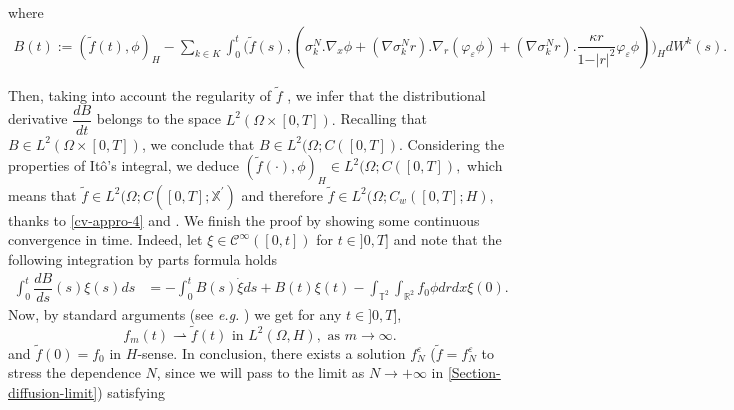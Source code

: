\documentclass[a4paper,12pt, reqno]{amsart}
\begin{document}
 where 
        \begin{align*}
            B(t) :=(\widetilde{f}(t), \phi )_H  -\sum_{k\in K}\int_0^t\big(\widetilde{f}(s),( \sigma_k^N.\nabla_x\phi +(\nabla \sigma_k^Nr).\nabla_r (\varphi_\varepsilon\phi)+(\nabla \sigma_k^Nr).\dfrac{\kappa r}{1-\vert r\vert^2}\varphi_\varepsilon\phi)\big)_HdW^k(s).
        \end{align*}

	Then, taking into account the regularity    of $\widetilde    f$ , we infer that the distributional derivative $\dfrac{dB}{dt}$ belongs to the space $L^2(\Omega\times[0,T]).$ Recalling that $B\in L^2(\Omega\times[0,T])$, we conclude that $ B\in   L^2(\Omega;C([0,T])$.
	Considering the properties of  It\^o's integral, we deduce
	$ (\widetilde    f(\cdot), \phi)_H \in L^2(\Omega;C([0,T]),$
	which  means   that   $\widetilde    f\in  L^2(\Omega;C([0,T];\mathbb{X}^\prime)$ and   therefore 
	$\widetilde    f\in  L^2(\Omega;C_w([0,T];H),$ thanks to \eqref{cv-appro-4}    and \cite[Lemma. 1.4 p. 263]{Temam77}. We   finish  the proof   by  showing some    continuous  convergence in  time.   Indeed,
	let  $\xi \in \mathcal{C}^\infty([0,t])$ for $t\in ]0,T]$ and note that the	following	integration	by	parts	formula	holds
	\begin{align}\label{IPPtimez-1}
		\int_0^t	\dfrac{dB}{ds}(s)\xi(s) ds&=-\int_0^tB(s)\dot\xi ds+B(t)\xi(t)-\int_{\mathbb{T}^2}\int_{\mathbb{R}^2}    f_0 \phi drdx\xi(0).
	\end{align}
	Now,    by  standard   arguments  (see \textit{e.g.}  \cite[proof    of  Prop. 3.]{vallet2019well} ) we  get
	for any $t\in ]0,T]$, $$    f_m(t)  \rightharpoonup \widetilde    f(t) \text{ in } L^2(\Omega,H), \text{ as } m\to \infty.$$
	and    $\widetilde f(0)=f_0$   in  $H$-sense. 	In  conclusion,     there   exists  a   solution $f^\varepsilon_N$  ($\widetilde  f=f^\varepsilon_N$  to  stress  the dependence  $N$,    since   we  will    pass    to  the limit   as  $N\to   +\infty $   in  \autoref{Section-diffusion-limit}) satisfying
\end{document}
